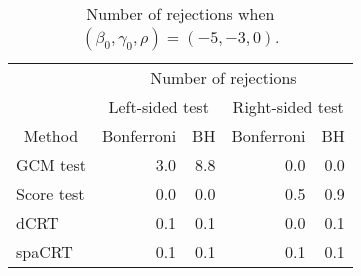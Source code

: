 \begin{table}[!h]
\centering
\caption{\label{tab:simulation_rejection_beta_-5_gamma_-3}Number of rejections when $(\beta_0,\gamma_0,\rho) = (-5, -3, 0)$.}
\centering
\begin{tabular}[t]{lrrrr}
\toprule
\multicolumn{1}{c}{ } & \multicolumn{4}{c}{Number of rejections} \\
\cmidrule(l{3pt}r{3pt}){2-5}
\multicolumn{1}{c}{ } & \multicolumn{2}{c}{Left-sided test} & \multicolumn{2}{c}{Right-sided test} \\
\cmidrule(l{3pt}r{3pt}){2-3} \cmidrule(l{3pt}r{3pt}){4-5}
\multicolumn{1}{c}{Method} & \multicolumn{1}{c}{Bonferroni} & \multicolumn{1}{c}{BH} & \multicolumn{1}{c}{Bonferroni} & \multicolumn{1}{c}{BH} \\
\cmidrule(l{3pt}r{3pt}){1-1} \cmidrule(l{3pt}r{3pt}){2-2} \cmidrule(l{3pt}r{3pt}){3-3} \cmidrule(l{3pt}r{3pt}){4-4} \cmidrule(l{3pt}r{3pt}){5-5}
GCM test & 3.0 & 8.8 & 0.0 & 0.0\\
Score test & 0.0 & 0.0 & 0.5 & 0.9\\
dCRT & 0.1 & 0.1 & 0.0 & 0.1\\
spaCRT & 0.1 & 0.1 & 0.1 & 0.1\\
\bottomrule
\end{tabular}
\end{table}
